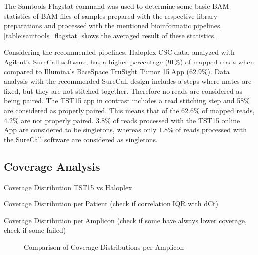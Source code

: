 The Samtools Flagstat command was used to determine some basic BAM statistics of
BAM files of samples prepared with the respective library preparations and
processed with the mentioned bioinformatic pipelines.
\ref{table:samtools_flagstat} shows the averaged result of these statistics.

Considering the recommended pipelines, Haloplex CSC data, analyzed with
Agilent's SureCall software, has a higher percentage (91\%) of mapped reads when
compared to Illumina's BaseSpace TruSight Tumor 15 App (62.9\%). Data analysis
with the recommended SureCall design includes a steps where mates are fixed, but
they are not stitched together. Therefore no reads are considered as being
paired. The TST15 app in contrast includes a read stitching step and 58\% are
considered as properly paired. This means that of the 62.6\% of mapped reads,
4.2\% are not properly paired. 3.8\% of reads processed with the TST15 online
App are considered to be singletons, whereas only 1.8\% of reads processed with
the SureCall software are considered as singletons.

\subsection{Coverage Analysis}

Coverage Distribution TST15 vs Haloplex

Coverage Distribution per Patient (check if correlation IQR with dCt)

Coverage Distribution per Amplicon (check if some have always lower coverage, check if some failed)
\begin{figure}[!tbp]
  \centering
  \hfill
  \caption{Comparison of Coverage Distributions per Amplicon}
\end{figure}

